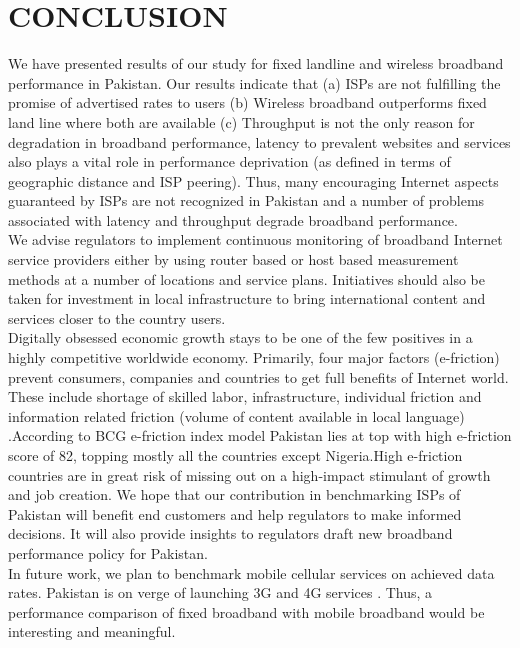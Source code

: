 \documentclass{sig-alternate-10pt}
\begin{document}
\section {CONCLUSION}
We have presented results of our study for fixed landline and wireless broadband performance in Pakistan. Our results indicate that (a) ISPs are not fulfilling the promise of advertised rates to users (b) Wireless broadband outperforms fixed land line where both are available (c) Throughput is not the only reason for degradation in broadband performance, latency to prevalent websites and services also plays a vital role in performance deprivation (as defined in terms of geographic distance and ISP peering). Thus, many encouraging Internet aspects guaranteed by ISPs are not recognized in Pakistan and a number of problems associated with latency and throughput degrade broadband performance.\\
\indent We advise regulators to implement continuous monitoring of broadband Internet service providers either by using router based or host based measurement methods at a number of locations and service plans. Initiatives should also be taken for investment in local infrastructure to bring international content and services closer to the country users.\\
\indent Digitally obsessed economic growth stays to be one of the few positives in a highly competitive worldwide economy. Primarily, four major factors (e-friction) prevent consumers, companies and countries to get full benefits of Internet world.  These include shortage of skilled labor, infrastructure, individual friction and information related friction (volume of content available in local language) \cite{30}.According to BCG e-friction index model \cite{31} Pakistan lies at top with high e-friction score of 82, topping mostly all the countries except Nigeria.High e-friction countries are in great risk of missing out on a high-impact stimulant of growth and job creation. We hope that our contribution in benchmarking ISPs of Pakistan will benefit end customers and help regulators to make informed decisions. It will also provide insights to regulators draft new broadband performance policy for Pakistan.\\
\indent In future work, we plan to benchmark mobile cellular services on achieved data rates. Pakistan is on verge of launching 3G and 4G services \cite {32,33}.  Thus, a performance comparison of fixed broadband with mobile broadband would be interesting and meaningful.








\end{document}
